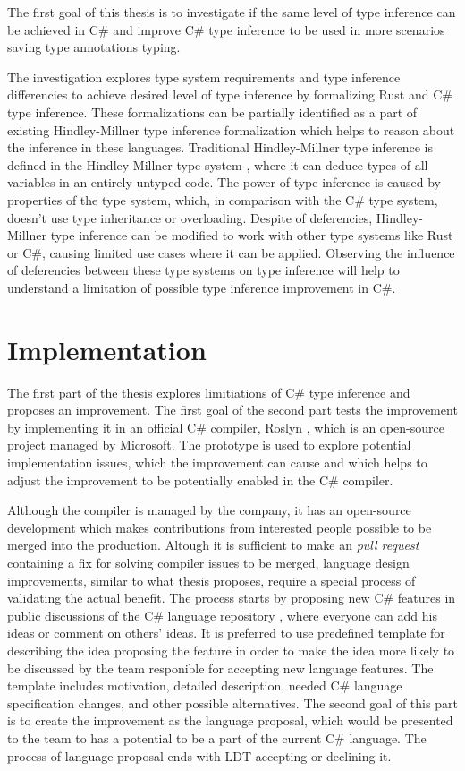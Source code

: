 The first goal of this thesis is to investigate if the same level of type inference can be achieved in C\# and improve C\# type inference to be used in more scenarios saving type annotations typing.
\par
The investigation explores type system requirements and type inference differencies to achieve desired level of type inference by formalizing Rust and C\# type inference.
These formalizations can be partially identified as a part of existing Hindley-Millner \cite{online:yHM} type inference formalization which helps to reason about the inference in these languages.
Traditional Hindley-Millner type inference is defined in the Hindley-Millner type system \cite{online:wikiHM}, where it can deduce types of all variables in an entirely untyped code. 
The power of type inference is caused by properties of the type system, which, in comparison with the C\# type system, doesn't use type inheritance or overloading. 
Despite of deferencies, Hindley-Millner type inference can be modified to work with other type systems like Rust or C\#, causing limited use cases where it can be applied.
Observing the influence of deferencies between these type systems on type inference will help to understand a limitation of possible type inference improvement in C\#.

\section{Implementation}

The first part of the thesis explores limitiations of C\# type inference and proposes an improvement.
The first goal of the second part tests the improvement by implementing it in an official C\# compiler, Roslyn \cite{online:langRepo}, which is an open-source project managed by Microsoft.
The prototype is used to explore potential implementation issues, which the improvement can cause and which helps to adjust the improvement to be potentially enabled in the C\# compiler.
\par
Although the compiler is managed by the company, it has an open-source development which makes contributions from interested people possible to be merged into the production.
Altough it is sufficient to make an \textit{pull request} containing a fix for solving compiler issues to be merged, language design improvements, similar to what thesis proposes, require a special process of validating the actual benefit.
The process starts by proposing new C\# features in public discussions of the C\# language repository \cite{online:langRepo}, where everyone can add his ideas or comment on others' ideas. 
It is preferred to use predefined template \cite{online:proposalTemplate} for describing the idea proposing the feature in order to make the idea more likely to be discussed by the team responible for accepting new language features. 
The template includes motivation, detailed description, needed C\# language specification \cite{online:langSpec} changes, and other possible alternatives.
The second goal of this part is to create the improvement as the language proposal, which would be presented to the team to has a potential to be a part of the current C\# language.
The process of language proposal ends with \ac{LDT} accepting or declining it. 


